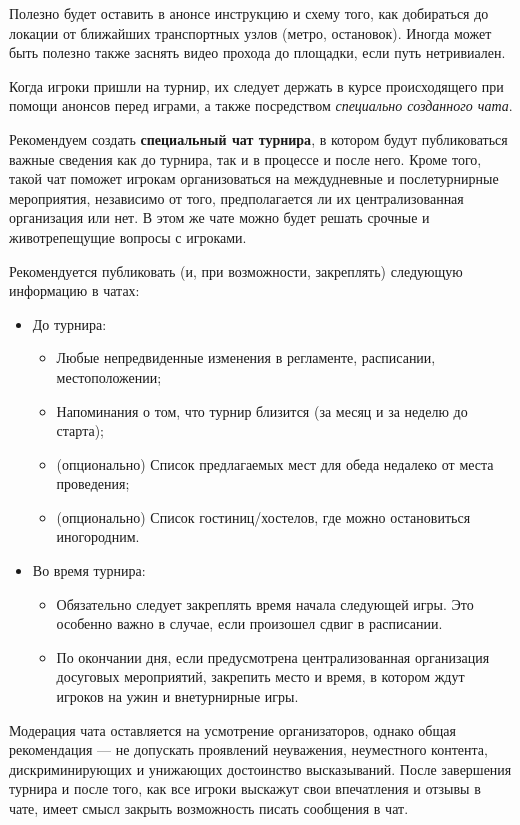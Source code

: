 Полезно будет оставить в анонсе инструкцию и схему того, как добираться до локации от ближайших транспортных узлов (метро, остановок). Иногда может быть полезно также заснять видео прохода до площадки, если путь нетривиален.

Когда игроки пришли на турнир, их следует держать в курсе происходящего при помощи анонсов перед играми, а также посредством \textit{специально созданного чата}.

Рекомендуем создать \textbf{специальный чат турнира}, в котором будут публиковаться важные сведения как до турнира, так и в процессе и после него. Кроме того, такой чат поможет игрокам организоваться на междудневные и послетурнирные мероприятия, независимо от того, предполагается ли их централизованная организация или нет. В этом же чате можно будет решать срочные и животрепещущие вопросы с игроками.

Рекомендуется публиковать (и, при возможности, закреплять) следующую информацию в чатах:
\begin{itemize}
	\item До турнира:
	\begin{itemize}
		\item Любые непредвиденные изменения в регламенте, расписании, местоположении;
		\item Напоминания о том, что турнир близится (за месяц и за неделю до старта);
		\item (опционально) Список предлагаемых мест для обеда недалеко от места проведения;
		\item (опционально) Список гостиниц/хостелов, где можно остановиться иногородним.
	\end{itemize}
	\item Во время турнира:
	\begin{itemize}
		\item Обязательно следует закреплять время начала следующей игры. Это особенно важно в случае, если произошел сдвиг в расписании.
		\item По окончании дня, если предусмотрена централизованная организация досуговых мероприятий, закрепить место и время, в котором ждут игроков на ужин и внетурнирные игры.
	\end{itemize}
\end{itemize}

Модерация чата оставляется на усмотрение организаторов, однако общая рекомендация --- не допускать проявлений неуважения, неуместного контента, дискриминирующих и унижающих достоинство высказываний. После завершения турнира и после того, как все игроки выскажут свои впечатления и отзывы в чате, имеет смысл закрыть возможность писать сообщения в чат. 

